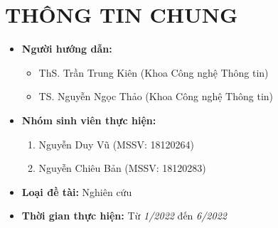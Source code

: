 \documentclass{article}[14pt]
\begin{document}
    \vspace{.5cm}
    
    \Large
    \section{THÔNG TIN CHUNG}
    \begin{itemize}[label = {}]
        
        \item \textbf{Người hướng dẫn:} 
        \begin{itemize}
            \item ThS. Trần Trung Kiên (Khoa Công nghệ Thông tin)
            \item TS. Nguyễn Ngọc Thảo (Khoa Công nghệ Thông tin)
        \end{itemize}{}
    
        
        \item \textbf{Nhóm sinh viên thực hiện:}
        
        \begin{enumerate}
        
            \item Nguyễn Duy Vũ (MSSV: 18120264) 
            \item Nguyễn Chiêu Bản (MSSV: 18120283)
        \end{enumerate}

        \item \textbf{Loại đề tài:} Nghiên cứu
        
        \item \textbf{Thời gian thực hiện:} Từ \textit{1/2022} đến \textit{6/2022}
        
        
    \end{itemize}
    
\end{document}
